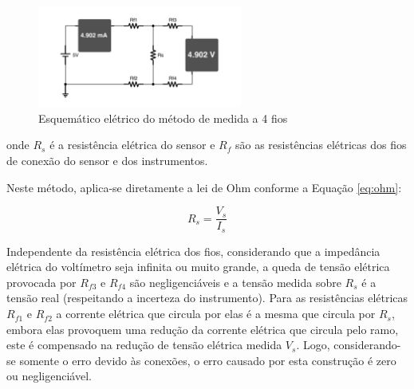\documentclass[a4paper]{instrumentacao}
\begin{document}
\begin{figure}[H]
\centering
\includegraphics[width=0.6\textwidth]{4WireMeasure.pdf}
\caption{Esquemático elétrico do método de medida a 4 fios}
\label{fig:4wire-circuit}
\end{figure}

\noindent onde $R_s$ é a resistência elétrica do sensor e $R_f$ são as resistências elétricas dos fios de conexão do sensor e dos instrumentos.

Neste método, aplica-se diretamente a lei de Ohm conforme a Equação \ref{eq:ohm}:

\begin{equation}
	R_s = \frac{V_s}{I_s}
	\label{eq:ohm}
\end{equation}

Independente da resistência elétrica dos fios, considerando que a impedância elétrica do voltímetro seja infinita ou muito grande, a queda de tensão elétrica provocada por $R_{f3}$ e $R_{f4}$ são negligenciáveis e a tensão medida sobre $R_s$ é a tensão real (respeitando a incerteza do instrumento). Para as resistências elétricas $R_{f1}$ e $R_{f2}$ a corrente elétrica que circula por elas é a mesma que circula por $R_s$, embora elas provoquem uma redução da corrente elétrica que circula pelo ramo, este é compensado na redução de tensão elétrica medida $V_s$. Logo, considerando-se somente o erro devido às conexões, o erro causado por esta construção é zero ou negligenciável.



\end{document}
